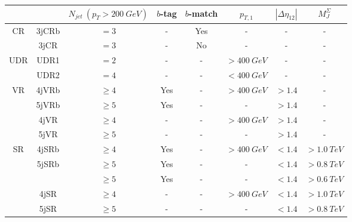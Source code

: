 \begin{table}
    \centering

    \begin{tabular}{cccccccc}

        \toprule
                             &                        & $N_{jet}~(p_T>200~GeV)$ & $b$-tag & $b$-match & $p_{T,1}$  & $|\Delta\eta_{12}|$ & $M_{J}^{\Sigma}$ \\
        \midrule
        \multirow{2}{*}{CR}  & 3jCRb                  & $=3$                    & -       & Yes       & -          & -                   & - \\
                             & 3jCR                   & $=3$                    & -       & No        & -          & -                   & - \\
        \midrule
        \multirow{2}{*}{UDR} & UDR1                   & $=2$                    & -       & -         & $>400~GeV$ & -                   & - \\
                             & UDR2                   & $=4$                    & -       & -         & $<400~GeV$ & -                   & - \\
        \midrule
        \multirow{4}{*}{VR}  & 4jVRb                  & $\geq4$                 & Yes     & -         & $>400~GeV$ & $>1.4$              & - \\
                             & 5jVRb                  & $\geq5$                 & Yes     & -         & -          & $>1.4$              & - \\
                             & 4jVR                   & $\geq4$                 & -       & -         & $>400~GeV$ & $>1.4$              & - \\
                             & 5jVR                   & $\geq5$                 & -       & -         & -          & $>1.4$              & - \\
        \hline
        \multirow{5}{*}{SR}  & 4jSRb                  & $\geq4$                 & Yes     & -         & $>400~GeV$ & $<1.4$              & $>1.0~TeV$ \\
                             & \multirow{2}{*}{5jSRb} & $\geq5$                 & Yes     & -         & -          & $<1.4$              & $>0.8~TeV$ \\
                             &                        & $\geq5$                 & Yes     & -         & -          & $<1.4$              & $>0.6~TeV$ \\
                             & 4jSR                   & $\geq4$                 & -       & -         & $>400~GeV$ & $<1.4$              & $>1.0~TeV$ \\
                             & 5jSR                   & $\geq5$                 & -       & -         & -          & $<1.4$              & $>0.8~TeV$ \\
        \bottomrule
    \end{tabular}


\end{table}
